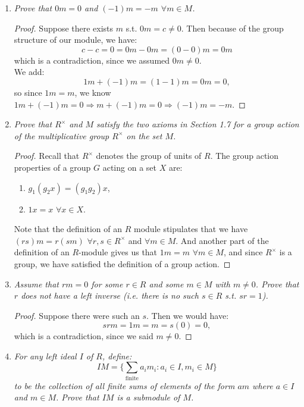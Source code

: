 \documentclass[9pt,reqno,twoside]{amsbook}
\theoremstyle{plain}
\numberwithin{section}{chapter}
\numberwithin{equation}{chapter}
\theoremstyle{definition}
\theoremstyle{remark}
\theoremstyle{plain}
\begin{document}
\begin{enumerate}[label=\arabic*.]
\item
\textit{Prove that $0m = 0$ and $(-1)m = -m$ $\forall m \in M$. }

\begin{proof}
Suppose there exists $m$ s.t. $0m = c \neq 0$. Then because of the group structure of our module, we have: 
$$
c - c = 0 = 0m - 0m = (0 - 0)m = 0m
$$
which is a contradiction, since we assumed $0m \neq 0$. \\
We add:
$$
1m + (-1)m = (1 - 1)m = 0m = 0,
$$
so since $1m = m$, we know $1m + (-1)m = 0 \Rightarrow m + (-1)m = 0 \Rightarrow (-1)m = -m$. 
\end{proof}



\item \textit{Prove that $R^\times$ and $M$ satisfy the two axioms in Section 1.7 for a group action of the multiplicative group $R^\times$ on the set $M$. }

\begin{proof}
Recall that $R^\times$ denotes the group of units of $R$. The group action properties of a group $G$ acting on a set $X$ are: 
\begin{enumerate}
\item $g_1(g_2x) = (g_1g_2)x$,
\item $1x = x$ $\forall x \in X$.
\end{enumerate}
Note that the definition of an $R$ module stipulates that we have $(rs)m = r(sm)$ $\forall r,s \in R^\times$ and $\forall m \in M$. And another part of the definition of an $R$-module gives us that $1m = m$ $\forall m \in M$, and since $R^\times$ is a group, we have satisfied the definition of a group action. 
\end{proof}
\vspace{20mm}
\item \textit{Assume that $rm = 0$ for some $r \in R$ and some $m \in M$ with $m \neq 0$. Prove that $r$ does not have a left inverse (i.e. there is no such $s \in R$ s.t. $sr = 1$). }
\begin{proof}
Suppose there were such an $s$. Then we would have:
$$
srm = 1m = m = s(0) = 0,
$$
which is a contradiction, since we said $m \neq 0$. 
\end{proof}
\vspace{3mm}
\setcounter{enumi}{4}
\item \textit{For any left ideal $I$ of $R$, define: 
$$
IM = \{\sum_{\text{finite}}a_im_i:a_i\in I, m_i \in M\}
$$
to be the collection of all finite sums of elements of the form $am$ where $a \in I$ and $m \in M$. Prove that $IM$ is a submodule of $M$. }


\end{enumerate}
\end{document}
